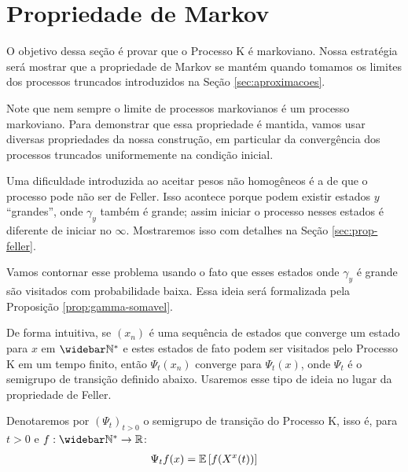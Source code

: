 
\section{Propriedade de Markov}
\label{sec:prop-markov}

O objetivo dessa seção é provar que o Processo K é markoviano. Nossa
estratégia será mostrar que a propriedade de Markov se mantém quando
tomamos os limites dos processos truncados introduzidos na Seção
\ref{sec:aproximacoes}.

Note que nem sempre o limite de processos markovianos é um processo
markoviano. Para demonstrar que essa propriedade é mantida, vamos usar
diversas propriedades da nossa construção, em particular da
convergência dos processos truncados uniformemente na condição
inicial.

Uma dificuldade introduzida ao aceitar pesos não homogêneos é a de que
o processo pode não ser de Feller. Isso acontece porque podem existir
estados $y$ ``grandes'', onde $\gamma_y$ também é grande; assim
iniciar o processo nesses estados é diferente de iniciar no
$\infty$. Mostraremos isso com detalhes na Seção
\ref{sec:prop-feller}.

Vamos contornar esse problema usando o fato que esses estados onde
$\gamma_y$ é grande são visitados com probabilidade baixa. Essa ideia
será formalizada pela Proposição \ref{prop:gamma-somavel}.

De forma intuitiva, se $(x_n)$ é uma sequência de estados que converge
um estado para $x$ em $\Nzb$ e estes estados de fato podem ser
visitados pelo Processo K em um tempo finito, então $\Psi_t(x_n)$
converge para $\Psi_t (x)$, onde $\Psi_t$ é o semigrupo de transição
definido abaixo. Usaremos esse tipo de ideia no lugar da propriedade
de Feller.

\begin{definicao}
  \label{def:semigrupo}
  Denotaremos por $(\Psi_t)_{t > 0}$ o semigrupo de transição do
  Processo K, isso é, para $t > 0$ e $f: \Nzb \to \R$:
  \begin{gather*}
    \Psi_t f (x) = {\mathbb{E}} \left[ f(X^x(t)) \right]
  \end{gather*}
\end{definicao}

